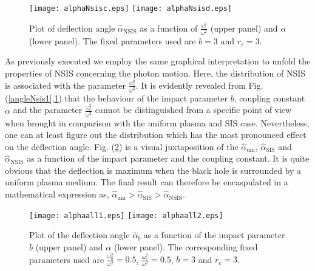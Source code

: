 \documentclass[final,5p,times,twocolumn,unknownkeysallowed]{elsarticle}
\begin{document}
\begin{figure}[h!]
 \begin{center}
   \texttt{[image: alphaNsisc.eps]}
   \texttt{[image: alphaNsisd.eps]}
  \end{center}
\caption{Plot of deflection angle $\hat{\alpha}_\mathrm{NSIS}$ as a function of $\frac{\omega^2_{c}}{\omega^2}$
(upper panel) and $\alpha$ (lower panel). The fixed parameters used
are $b=3$ and $r_c=3$.}\label{angleNsis2}
\end{figure}

As previously executed we employ the same graphical interpretation to unfold the properties of NSIS concerning the photon motion.
Here, the distribution of NSIS is associated with the parameter $\frac{\omega^2_{c}}{\omega^2}$. It is evidently revealed
from Fig. (\ref{angleNsis1},\ref{angleNsis2}) that the behaviour of the impact parameter $b$,
coupling constant $\alpha$ and the parameter $\frac{\omega^2_{c}}{\omega^2}$
cannot be distinguished from a specific point of view when brought in comparison with the uniform plasma and SIS case.
Nevertheless, one can at least figure out the distribution which has the most pronounced effect on the deflection angle.
Fig. (\ref{angle}) is a visual juxtaposition of the $\hat{\alpha}_\mathrm{uni}$, $\hat{\alpha}_\mathrm{SIS}$ and $\hat{\alpha}_\mathrm{NSIS}$
as a function of the impact parameter and the coupling constant. It is quite obvious that the deflection is maximum
when the black hole is surrounded by a uniform plasma medium. The final result can therefore be encaspulated in a mathematical expression as,
$\hat{\alpha}_\mathrm{uni}> \hat{\alpha}_\mathrm{SIS}>\hat{\alpha}_\mathrm{NSIS}$.


\begin{figure}[h!]
 \begin{center}
   \texttt{[image: alphaall1.eps]}
   \texttt{[image: alphaall2.eps]}
  \end{center}
\caption{Plot of the deflection angle $\hat{\alpha}_{b}$ as a function of the impact
parameter $b$ (upper panel) and $\alpha$ (lower panel). The corresponding fixed parameters used are
$\frac{\omega^2_{0}}{\omega^2}=0.5$, $\frac{\omega^2_{c}}{\omega^2}=0.5$, $b=3$ and $r_c=3$.}\label{angle}
\end{figure}
\end{document}
